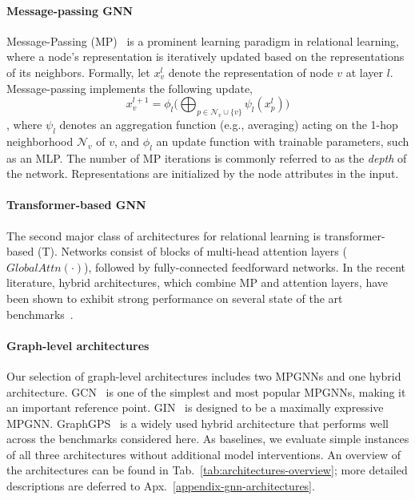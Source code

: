 \paragraph{Message-passing GNN}
Message-Passing (MP)~\citep{gori2005new,Hamilton:2017tp} is a prominent learning paradigm in relational learning, where a node’s representation is iteratively updated based on the representations of its neighbors. Formally, let $x_v^l$ denote the representation of node $v$ at layer $l$. Message-passing implements the following update,
$$x_v^{l+1} = \phi_l \Big( \bigoplus_{p \in \mathcal{N}_v \cup \{v\}} \psi_l \left ( x_p^l\right)\Big)$$,
where $\psi_l$ denotes an aggregation function (e.g., averaging) acting on the 1-hop neighborhood $\mathcal{N}_v$ of $v$, and $\phi_l$ an update function with trainable parameters, such as an MLP. The number of MP iterations is commonly referred to as the \emph{depth} of the network. Representations are initialized by the node attributes in the input.


\paragraph{Transformer-based GNN}
The second major class of architectures for relational learning is transformer-based (T). Networks consist of blocks of multi-head attention layers ($GlobalAttn(\cdot)$), followed by fully-connected feedforward networks. In the recent literature, hybrid architectures, which combine MP and attention layers, have been shown to exhibit strong performance on several state of the art benchmarks~\citep{rampavsek2022recipe}.

\paragraph{Graph-level architectures}
Our selection of graph-level architectures includes two MPGNNs and one hybrid architecture. GCN~\citep{kipf2016semi} is one of the simplest and most popular MPGNNs, making it an important reference point. GIN~\citep{xu2018powerful} is designed to be a  maximally expressive MPGNN. GraphGPS~\citep{rampavsek2022recipe} is a widely used hybrid architecture that performs well across the benchmarks considered here. As baselines, we evaluate simple instances of all three architectures without additional model interventions. An overview of the architectures can be found in Tab.~\ref{tab:architectures-overview}; more detailed descriptions are deferred to Apx.~\ref{appendix-gnn-architectures}.

